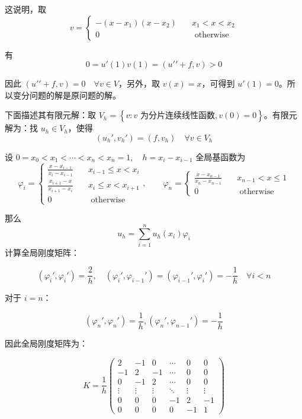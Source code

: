 \documentclass[UTF8]{ctexart}
\begin{document}
这说明，取 \[v = \begin{cases}
 - \left( x - x_{1} \right)\left( x - x_{2} \right) & \quad x_{1} < x < x_{2} \\
0 & \quad\text{ otherwise }
\end{cases}\]

有 \[0 = u\prime(1)v(1) = (u\prime\prime + f,v) > 0\]

因此 \((u\prime\prime + f,v) = 0\quad\forall v \in V\)，另外，取
\(v(x) = x\)，可得到 \(u\prime(1) = 0\)。所以变分问题的解是原问题的解。

下面描述其有限元解：取
\(V_{h} = \left\{ v:v\text{ 为分片连续线性函数},v(0) = 0 \right\}\)。有限元解为：找
\(u_{h} \in V_{h}\)，使得
\[\left( u_{h}\prime,v_{h}\prime \right) = \left( f,v_{h} \right)\quad\forall v \in V_{h}\]

设
\(0 = x_{0} < x_{1} < \cdots < x_{n} < x_{n} = 1,\quad h = x_{i} - x_{i - 1}\)
全局基函数为 \[\varphi_{i} = \begin{cases}
\frac{x - x_{i - 1}}{x_{i} - x_{i - 1}} & \quad x_{i - 1} \leq x < x_{i} \\
\frac{x_{i + 1} - x}{x_{i + 1} - x_{i}} & \quad x_{i} \leq x < x_{i + 1} \\
0 & \quad\text{ otherwise }
\end{cases},\quad\quad\varphi_{n} = \begin{cases}
\frac{x - x_{n - 1}}{x_{n} - x_{n - 1}} & \quad x_{n - 1} < x \leq 1 \\
0 & \quad\text{ otherwise }
\end{cases}\]

那么 \[u_{h} = \sum_{i = 1}^{n}u_{h}\left( x_{i} \right)\varphi_{i}\]
计算全局刚度矩阵：

\[\left( \varphi_{i}\prime,\varphi_{i}\prime \right) = \frac{2}{h},\quad\left( \varphi_{i}\prime,\varphi_{i - 1}\prime \right) = \left( \varphi_{i - 1}\prime,\varphi_{i}\prime \right) = - \frac{1}{h}\quad\forall i < n\]

对于 \(i = n\)：

\[\left( \varphi_{n}\prime,\varphi_{n}\prime \right) = \frac{1}{h},\left( \varphi_{n}\prime,\varphi_{n - 1}\prime \right) = - \frac{1}{h}\]

因此全局刚度矩阵为：

\[K = \frac{1}{h}\begin{pmatrix}
2 & - 1 & 0 & \cdots & 0 & 0 \\
 - 1 & 2 & - 1 & \cdots & 0 & 0 \\
0 & - 1 & 2 & \cdots & 0 & 0 \\
 \vdots & \vdots & \vdots & \ddots & \vdots & \vdots \\
0 & 0 & 0 & - 1 & 2 & - 1 \\
0 & 0 & 0 & 0 & - 1 & 1
\end{pmatrix}\]
\end{document}
